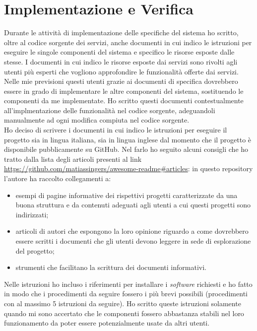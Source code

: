 \pagebreak

\section{Implementazione e Verifica}

Durante le attività di implementazione delle specifiche del sistema ho scritto, oltre al codice sorgente dei servizi, anche documenti in cui indico le istruzioni per eseguire le singole componenti del sistema e specifico le risorse esposte dalle stesse.
I documenti in cui indico le risorse esposte dai servizi sono rivolti agli utenti più esperti che vogliono approfondire le funzionalità offerte dai servizi. Nelle mie previsioni questi utenti grazie ai documenti di specifica dovrebbero essere in grado di implementare le altre componenti del sistema, sostituendo le componenti da me implementate. Ho scritto questi documenti contestualmente all'implmentazione delle funzionalità nel codice sorgente, adeguandoli manualmente ad ogni modifica compiuta nel codice sorgente.\\
Ho deciso di scrivere i documenti in cui indico le istruzioni per eseguire il progetto sia in lingua italiana, sia in lingua inglese dal momento che il progetto è disponibile pubblicamente su GitHub. Nel farlo ho seguito alcuni consigli che ho tratto dalla lista degli articoli presenti al link \url{https://github.com/matiassingers/awesome-readme\#articles}: in questo \gls{repository} l'autore ha raccolto collegamenti a:
\begin{itemize}
  \item esempi di pagine informative dei rispettivi progetti caratterizzate da una buona struttura e da contenuti adeguati agli utenti a cui questi progetti sono indirizzati;
  \item articoli di autori che espongono la loro opinione riguardo a come dovrebbero essere scritti i documenti che gli utenti devono leggere in sede di esplorazione del progetto;
  \item strumenti che facilitano la scrittura dei documenti informativi.
\end{itemize}
Nelle istruzioni ho incluso i riferimenti per installare i \emph{software} richiesti e ho fatto in modo che i procedimenti da seguire fossero i più brevi possibili (procedimenti con al massimo 5 istruzioni da seguire). Ho scritto queste istruzioni solamente quando mi sono accertato che le componenti fossero abbastanza stabili nel loro funzionamento da poter essere potenzialmente usate da altri utenti.\\
